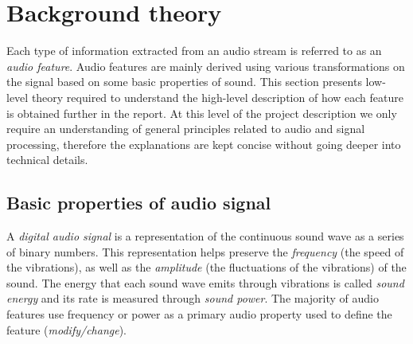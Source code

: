 
\chapter{Background theory}
\label{chap:relatedterms}
\ifpdf
    \graphicspath{{RelatedTerminology/Figures/PNG/}{RelatedTerminology/Figures/PDF/}{RelatedTerminology/Figures/}}
\else
    \graphicspath{{RelatedTerminology/Figures/EPS/}{RelatedTerminology/Figures/}}
\fi



%

Each type of information extracted from an audio stream is referred to as an
\textit{audio feature}. Audio features are mainly derived using various 
transformations on the signal based on some basic properties of sound. This
section presents low-level theory required to understand the high-level
description of how each feature is obtained further in the report. At this level
of the project description we only require an understanding of general
principles related to audio and signal processing, therefore the explanations
are kept concise without going deeper into technical details.


\section{Basic properties of audio signal}
\label{sec:audioprops}
A \textit{digital audio signal} is a representation of the continuous sound wave
as a series of binary numbers. This representation helps preserve the
\textit{frequency} (the speed of the vibrations), as well as the
\textit{amplitude} (the fluctuations of the vibrations) of the sound. The energy
that each sound wave emits through vibrations is called \textit{sound energy}
and its rate is measured through \textit{sound power}. The majority of audio
features use frequency or power as a primary audio property used to define the
feature (\textit{modify/change}). 

